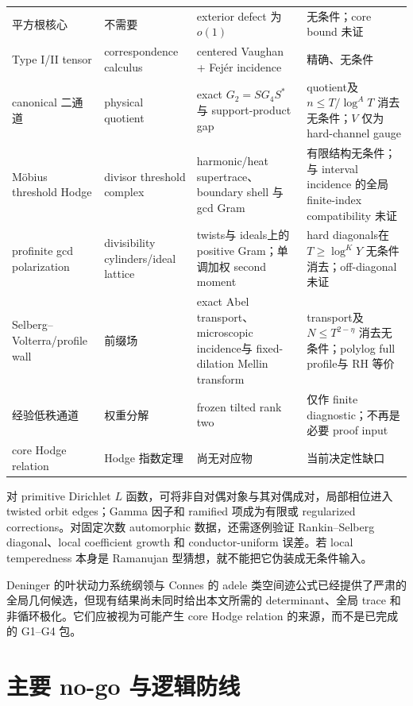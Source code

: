 \documentclass[UTF8,11pt,a4paper]{ctexart}
\theoremstyle{definition}
\theoremstyle{remark}
\newcommand{\1}{\mathbf 1}
\begin{document}
\begin{longtable}{@{}>{\raggedright\arraybackslash}p{}p{}p{}p{}@{}}
平方根核心 & 不需要 & exterior defect 为 \(o(1)\) & 无条件；core bound 未证\\
Type I/II tensor & correspondence calculus & centered Vaughan + Fej\'er incidence & 精确、无条件\\
canonical 二通道 & physical quotient & exact $G_2=SG_4S^*$ 与 support-product gap & quotient及 $n\leq T/\log^A T$ 消去无条件；$V$ 仅为 hard-channel gauge\\
M\"obius threshold Hodge & divisor threshold complex & harmonic/heat supertrace、boundary shell 与 gcd Gram & 有限结构无条件；与 interval incidence 的全局 finite-index compatibility 未证\\
profinite gcd polarization & divisibility cylinders/ideal lattice & twists与 ideals上的 positive Gram；单调加权 second moment & hard diagonals在 $T\geq\log^K Y$ 无条件消去；off-diagonal 未证\\
Selberg--Volterra/profile wall & 前缀场 & exact Abel transport、microscopic incidence与 fixed-dilation Mellin transform & transport及 $N\leq T^{2-\eta}$ 消去无条件；polylog full profile与 RH 等价\\
经验低秩通道 & 权重分解 & frozen tilted rank two & 仅作 finite diagnostic；不再是必要 proof input\\
core Hodge relation & Hodge 指数定理 & 尚无对应物 & 当前决定性缺口\\
\bottomrule
\end{longtable}
\endgroup

对 primitive Dirichlet $L$ 函数，可将非自对偶对象与其对偶成对，局部相位进入 twisted orbit edges；Gamma 因子和 ramified 项成为有限或 regularized corrections。对固定次数 automorphic 数据，还需逐例验证 Rankin--Selberg diagonal、local coefficient growth 和 conductor-uniform 误差。若 local temperedness 本身是 Ramanujan 型猜想，就不能把它伪装成无条件输入。

Deninger 的叶状动力系统纲领与 Connes 的 adele 类空间迹公式\cite{Deninger1998,ConnesTrace}已经提供了严肃的全局几何候选，但现有结果尚未同时给出本文所需的 determinant、全局 trace 和非循环极化。它们应被视为可能产生 core Hodge relation 的来源，而不是已完成的 G1--G4 包。

\section{主要 no-go 与逻辑防线}
\end{document}
